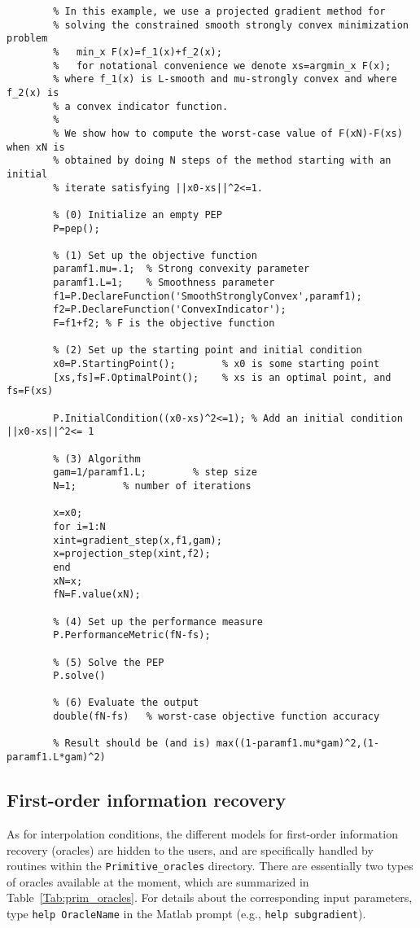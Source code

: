 \documentclass[11pt,a4paper]{article}
\begin{document}
		\begin{lstlisting}
		% In this example, we use a projected gradient method for
		% solving the constrained smooth strongly convex minimization problem
		%   min_x F(x)=f_1(x)+f_2(x); 
		%   for notational convenience we denote xs=argmin_x F(x);
		% where f_1(x) is L-smooth and mu-strongly convex and where f_2(x) is
		% a convex indicator function.
		%
		% We show how to compute the worst-case value of F(xN)-F(xs) when xN is
		% obtained by doing N steps of the method starting with an initial
		% iterate satisfying ||x0-xs||^2<=1.
		
		% (0) Initialize an empty PEP
		P=pep();
		
		% (1) Set up the objective function
		paramf1.mu=.1;	% Strong convexity parameter
		paramf1.L=1;    % Smoothness parameter
		f1=P.DeclareFunction('SmoothStronglyConvex',paramf1);
		f2=P.DeclareFunction('ConvexIndicator');
		F=f1+f2; % F is the objective function
		
		% (2) Set up the starting point and initial condition
		x0=P.StartingPoint();		 % x0 is some starting point
		[xs,fs]=F.OptimalPoint(); 	 % xs is an optimal point, and fs=F(xs)
		
		P.InitialCondition((x0-xs)^2<=1); % Add an initial condition ||x0-xs||^2<= 1
		
		% (3) Algorithm
		gam=1/paramf1.L;		% step size
		N=1;		% number of iterations
		
		x=x0;
		for i=1:N
		xint=gradient_step(x,f1,gam);
		x=projection_step(xint,f2);
		end
		xN=x;
		fN=F.value(xN);
		
		% (4) Set up the performance measure
		P.PerformanceMetric(fN-fs);
		
		% (5) Solve the PEP
		P.solve()
		
		% (6) Evaluate the output
		double(fN-fs)   % worst-case objective function accuracy
		
		% Result should be (and is) max((1-paramf1.mu*gam)^2,(1-paramf1.L*gam)^2)
		\end{lstlisting}
		\newpage
		\subsection{First-order information recovery}\label{sec:oracles}
		As for interpolation conditions, the different models for first-order information recovery (oracles) are hidden to the users, and are specifically handled by routines within the \verb?Primitive_oracles? directory. There are essentially two types of oracles available at the moment, which are summarized in Table~\ref{Tab:prim_oracles}.  For details about the corresponding input parameters, type \verb?help OracleName? in the Matlab prompt (e.g., \verb?help subgradient?).
		
\end{document}
